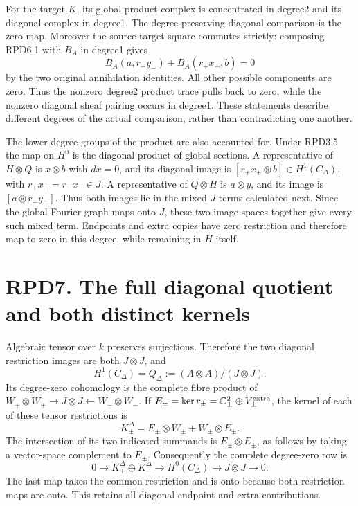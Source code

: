 For the target \(K\), its global product complex is concentrated in
degree2 and its diagonal complex in degree1. The degree-preserving
diagonal comparison is the zero map. Moreover the source-target square
commutes strictly: composing RPD6.1 with \(B_A\) in degree1 gives \[
B_A(a,r_-y_-)+B_A(r_+x_+,b)=0
\tag{RPD6.3}
\] by the two original annihilation identities. All other possible
components are zero. Thus the nonzero degree2 product trace pulls back
to zero, while the nonzero diagonal sheaf pairing occurs in degree1.
These statements describe different degrees of the actual comparison,
rather than contradicting one another.

The lower-degree groups of the product are also accounted for. Under
RPD3.5 the map on \(H^0\) is the diagonal product of global sections. A
representative of \(H\otimes Q\) is \(x\otimes b\) with \(dx=0\), and
its diagonal image is \([r_+x_+\otimes b]\in H^1(C_\Delta)\), with
\(r_+x_+=r_-x_-\in J\). A representative of \(Q\otimes H\) is
\(a\otimes y\), and its image is \([a\otimes r_-y_-]\). Thus both images
lie in the mixed \(J\)-terms calculated next. Since the global Fourier
graph maps onto \(J\), these two image spaces together give every such
mixed term. Endpoints and extra copies have zero restriction and
therefore map to zero in this degree, while remaining in \(H\) itself.

\section{RPD7. The full diagonal quotient and both distinct
kernels}\label{rpd7.-the-full-diagonal-quotient-and-both-distinct-kernels}

Algebraic tensor over \(k\) preserves surjections. Therefore the two
diagonal restriction images are both \(J\otimes J\), and \[
\boxed{H^1(C_\Delta)=Q_\Delta:=(A\otimes A)/(J\otimes J).}
\tag{RPD7.1}
\] Its degree-zero cohomology is the complete fibre product of
\(W_+\otimes W_+\to J\otimes J\leftarrow W_-\otimes W_-\). If
\(E_\pm=\ker r_\pm=\mathbb C^2_\pm\oplus V_\pm^{\rm extra}\), the kernel
of each of these tensor restrictions is \[
K_\pm^\Delta=
E_\pm\otimes W_\pm+W_\pm\otimes E_\pm.
\] The intersection of its two indicated summands is
\(E_\pm\otimes E_\pm\), as follows by taking a vector-space complement
to \(E_\pm\). Consequently the complete degree-zero row is \[
0\to K_+^\Delta\oplus K_-^\Delta
\to H^0(C_\Delta)\to J\otimes J\to0.
\tag{RPD7.2}
\] The last map takes the common restriction and is onto because both
restriction maps are onto. This retains all diagonal endpoint and extra
contributions.

